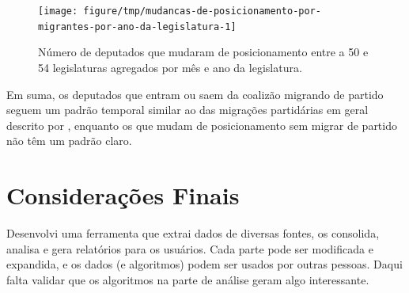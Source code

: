\documentclass[a4paper,titlepage]{ppgi}\usepackage[]{graphicx}\usepackage[]{color}
\newenvironment{knitrout}{}{} %
\begin{document}
\begin{knitrout}
\color{fgcolor}\begin{figure}
\texttt{[image: figure/tmp/mudancas-de-posicionamento-por-migrantes-por-ano-da-legislatura-1]} \caption[Número de deputados que mudaram de posicionamento entre a 50\textordfeminine{} e 54\textordfeminine{} legislaturas agregados por mês e ano da legislatura]{Número de deputados que mudaram de posicionamento entre a 50\textordfeminine{} e 54\textordfeminine{} legislaturas agregados por mês e ano da legislatura.}\label{fig:mudancas-de-posicionamento-por-migrantes-por-ano-da-legislatura}
\end{figure}


\end{knitrout}

Em suma, os deputados que entram ou saem da coalizão migrando de partido
seguem um padrão temporal similar ao das migrações partidárias em geral
descrito por , enquanto os que mudam de posicionamento
sem migrar de partido não têm um padrão claro.










\section{Considerações Finais}

Desenvolvi uma ferramenta que extrai dados de diversas fontes, os consolida, analisa e gera relatórios para os usuários. Cada parte pode ser modificada e expandida, e os dados (e algoritmos) podem ser usados por outras pessoas. Daqui falta validar que os algoritmos na parte de análise geram algo interessante.

\end{document}
